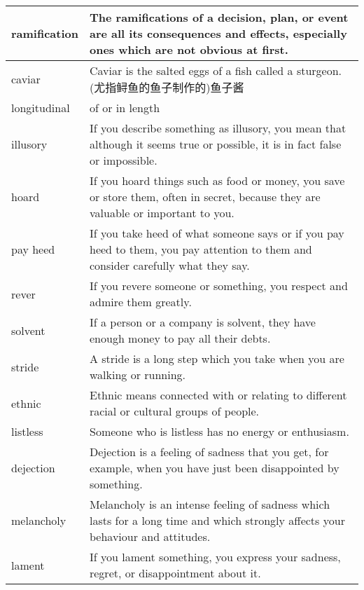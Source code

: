 \documentclass{article}
\begin{document}
\begin{center}
\begin{longtable}{|l|p{9cm}|}
\hline
ramification
&
The ramifications of a decision, plan, or event are all its consequences and effects, especially ones which are not obvious at first.
\\

\hline
caviar
&
Caviar is the salted eggs of a fish called a sturgeon. (尤指鲟鱼的鱼子制作的)鱼子酱
\\

\hline
longitudinal
&
of or in length
\\

\hline
illusory
&
If you describe something as illusory, you mean that although it seems true or possible, it is in fact false or impossible.
\\

\hline
hoard
&
If you hoard things such as food or money, you save or store them, often in secret, because they are valuable or important to you.
\\

\hline
pay heed
&
If you take heed of what someone says or if you pay heed to them, you pay attention to them and consider carefully what they say.
\\

\hline
rever
&
If you revere someone or something, you respect and admire them greatly.
\\

\hline
solvent
&
If a person or a company is solvent, they have enough money to pay all their debts.
\\

\hline
stride
&
A stride is a long step which you take when you are walking or running.
\\

\hline
ethnic
&
Ethnic means connected with or relating to different racial or cultural groups of people.
\\

\hline
listless
&
Someone who is listless has no energy or enthusiasm.
\\

\hline
dejection
&
Dejection is a feeling of sadness that you get, for example, when you have just been disappointed by something.
\\

\hline
melancholy
&
Melancholy is an intense feeling of sadness which lasts for a long time and which strongly affects your behaviour and attitudes.
\\

\hline
lament
&
If you lament something, you express your sadness, regret, or disappointment about it.
\\


\end{longtable}
\end{center}
\end{document}
